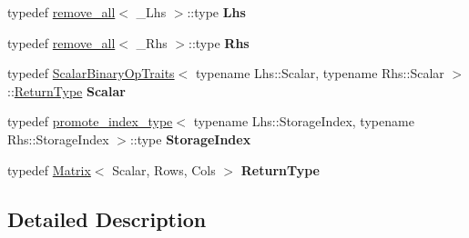 \begin{DoxyCompactItemize}
\item 
\mbox{\label{struct_eigen_1_1internal_1_1traits_3_01_kronecker_product_3_01___lhs_00_01___rhs_01_4_01_4_aa1a40be37fbd572f76a613004791da60}} 
typedef \hyperlink{struct_eigen_1_1internal_1_1remove__all}{remove\+\_\+all}$<$ \+\_\+\+Lhs $>$\+::type {\bfseries Lhs}
\item 
\mbox{\label{struct_eigen_1_1internal_1_1traits_3_01_kronecker_product_3_01___lhs_00_01___rhs_01_4_01_4_a8aafe51a47232ee8ec2b004bdd59d3ae}} 
typedef \hyperlink{struct_eigen_1_1internal_1_1remove__all}{remove\+\_\+all}$<$ \+\_\+\+Rhs $>$\+::type {\bfseries Rhs}
\item 
\mbox{\label{struct_eigen_1_1internal_1_1traits_3_01_kronecker_product_3_01___lhs_00_01___rhs_01_4_01_4_a2927f991e1f07a8e120bf5b45bd5bf23}} 
typedef \hyperlink{group___core___module_struct_eigen_1_1_scalar_binary_op_traits}{Scalar\+Binary\+Op\+Traits}$<$ typename Lhs\+::\+Scalar, typename Rhs\+::\+Scalar $>$\+::\hyperlink{group___core___module_class_eigen_1_1_matrix}{Return\+Type} {\bfseries Scalar}
\item 
\mbox{\label{struct_eigen_1_1internal_1_1traits_3_01_kronecker_product_3_01___lhs_00_01___rhs_01_4_01_4_a7af240d5b7fcb783b3ac9e76f9055a70}} 
typedef \hyperlink{struct_eigen_1_1internal_1_1promote__index__type}{promote\+\_\+index\+\_\+type}$<$ typename Lhs\+::\+Storage\+Index, typename Rhs\+::\+Storage\+Index $>$\+::type {\bfseries Storage\+Index}
\item 
\mbox{\label{struct_eigen_1_1internal_1_1traits_3_01_kronecker_product_3_01___lhs_00_01___rhs_01_4_01_4_a7b14187ef42535a8982def992f924785}} 
typedef \hyperlink{group___core___module_class_eigen_1_1_matrix}{Matrix}$<$ Scalar, Rows, Cols $>$ {\bfseries Return\+Type}
\end{DoxyCompactItemize}


\subsection{Detailed Description}
